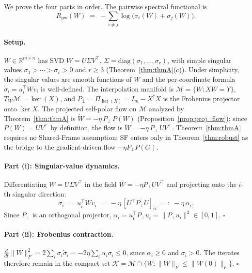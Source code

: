 \documentclass{article}
\begin{document}
We prove the four parts in order. The pairwise spectral functional is
\begin{equation}
  R_{\mathrm{pw}}(W) \;=\; -\sum_{i \neq j} \log\!\bigl(\sigma_i(W) + \sigma_j(W)\bigr).
  \label{eq:R_pairwise_app}
\end{equation}

\paragraph{Setup.}
$W \in \mathbb{R}^{m \times n}$ has SVD $W = U\Sigma V^\top$, $\Sigma = \mathrm{diag}(\sigma_1,\ldots,\sigma_r)$, with simple singular values $\sigma_1 > \cdots > \sigma_r > 0$ and $r \geq 3$ (Theorem~\ref{thm:thmA}(c)). Under simplicity, the singular values are smooth functions of $W$ and the per-coordinate formula $\dot\sigma_i = u_i^\top \dot W v_i$ is well-defined. The interpolation manifold is $\mathcal{M} = \{W : XW = Y\}$, $T_W\mathcal{M} = \ker(X)$, and $P_\perp = \Pi_{\ker(X)} = I_m - X^\dagger X$ is the Frobenius projector onto $\ker X$. The projected self-polar flow on $\mathcal M$ analyzed by Theorem~\ref{thm:thmA} is $\dot W = -\eta\,P_\perp\,P(W)$ (Proposition~\ref{prop:proj_flow}); since $P(W)=U V^\top$ by definition, the flow is $\dot W = -\eta\,P_\perp\,U V^\top$. Theorem~\ref{thm:thmA} requires no Shared-Frame assumption; \textsf{SF} enters only in Theorem~\ref{thm:robust} as the bridge to the gradient-driven flow $-\eta P_\perp P(G)$.

\paragraph{Part (i): Singular-value dynamics.}
Differentiating $W = U\Sigma V^\top$ in the field $\dot W = -\eta P_\perp UV^\top$ and projecting onto the $i$-th singular direction:
\[
  \dot{\sigma}_i \;=\; u_i^\top \dot{W} v_i \;=\; -\eta\,[U^\top P_\perp U]_{ii} \;=:\; -\eta\,\alpha_i.
\]
Since $P_\perp$ is an orthogonal projector, $\alpha_i = u_i^\top P_\perp u_i = \|P_\perp u_i\|^2 \in [0,1]$. \hfill$\square$

\paragraph{Part (ii): Frobenius contraction.}
$\frac{d}{dt}\|W\|_F^2 = 2\sum_i \sigma_i\dot\sigma_i = -2\eta\sum_i \alpha_i\sigma_i \leq 0$, since $\alpha_i\geq 0$ and $\sigma_i>0$. The iterates therefore remain in the compact set $\mathcal{K} = \mathcal{M}\cap\{W:\|W\|_F\leq\|W(0)\|_F\}$. \hfill$\square$
\end{document}
